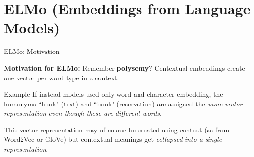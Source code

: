 

\section{ELMo (Embeddings from Language Models)}


\begin{frame}{ELMo: Motivation}
    \large \linespread{0.4}
    
    \textbf{Motivation for ELMo: }Remember \textbf{polysemy}? Contextual embeddings create one vector per word type in a context. 
    
    \begin{exampleBlock}{Example}
        If instead models used only word and character embedding, the homonyms ``book" (text) and ``book" (reservation) are assigned the \emph{same vector representation even though these are different words}. 
        
        This vector representation may of course be created using context (as from Word2Vec or GloVe) but contextual meanings get \emph{collapsed into a single representation}.
    \end{exampleBlock}
    
    
\end{frame}



